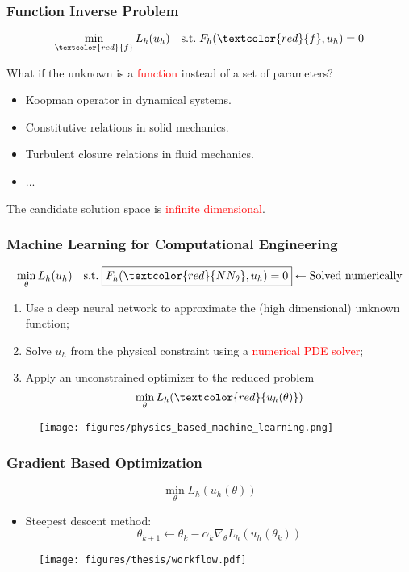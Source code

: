 \documentclass[usenames,dvipsnames]{beamer}
\begin{document}
\begin{frame}
	\frametitle{Function Inverse Problem}
	
	\begin{equation*}
		\min_{\textcolor{red}{f}} L_h(u_h) \quad \mathrm{s.t.}\; F_h(\textcolor{red}{f}, u_h) = 0
	\end{equation*}
	
	What if the unknown is a \textcolor{red}{function} instead of a set of parameters?
\begin{itemize}
	\item Koopman operator in dynamical systems.
	\item Constitutive relations in solid mechanics. 
	\item Turbulent closure relations in fluid mechanics.
	\item ...
\end{itemize}

The candidate solution space is \textcolor{red}{infinite dimensional}.

\end{frame}





\begin{frame}
	\frametitle{Machine Learning for Computational Engineering}
	$$\min_{\theta} L_h(u_h) \quad \mathrm{s.t.}\;\boxed{F_h(\textcolor{red}{NN_\theta}, u_h) = 0} \leftarrow \mbox{Solved numerically}$$
	\vspace{-0.5cm}
	\begin{enumerate}
		\item Use a deep neural network to approximate the (high dimensional) unknown function;
		\item Solve $u_h$ from the physical constraint using a \textcolor{red}{numerical PDE solver};
		\item Apply an unconstrained optimizer to the reduced problem
		$$\min_{\theta} L_h(\textcolor{red}{u_h(\theta)})$$
	\end{enumerate}
	\vspace{-0.3cm}
	\begin{figure}[hbt]
		\texttt{[image: figures/physics\_based\_machine\_learning.png]}
	\end{figure}
\end{frame}



\begin{frame}
	\frametitle{Gradient Based Optimization}
		$$\min_{\theta} L_h({u_h(\theta)})$$
	
	\begin{itemize}
		\item Steepest descent method:
		$$\theta_{k+1} \gets \theta_k - \alpha_k \nabla_\theta L_h(u_h(\theta_k))$$ 
	\end{itemize}
	
	\begin{figure}[hbt]
	\centering
  \texttt{[image: figures/thesis/workflow.pdf]}
\end{figure}

\end{frame}
\end{document}
